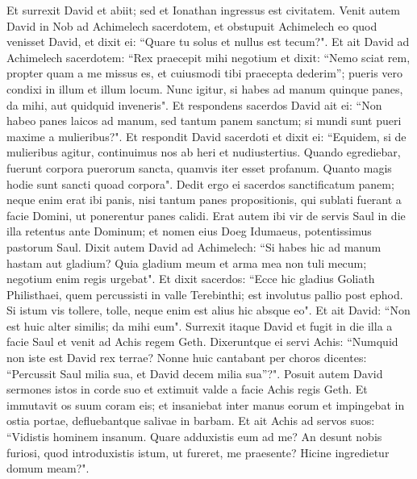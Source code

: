 \begin{biblechapter}  
\verse Et surrexit David et abiit; sed et Ionathan ingressus est civitatem.  
\verse Venit autem David in Nob ad Achimelech sacerdotem, et obstupuit Achimelech eo quod venisset David, et dixit ei: “Quare tu solus et nullus est tecum?". 
\verse Et ait David ad Achimelech sacerdotem: “Rex praecepit mihi negotium et dixit: “Nemo sciat rem, propter quam a me missus es, et cuiusmodi tibi praecepta dederim”; pueris vero condixi in illum et illum locum. 
\verse Nunc igitur, si habes ad manum quinque panes, da mihi, aut quidquid inveneris". 
\verse Et respondens sacerdos David ait ei: “Non habeo panes laicos ad manum, sed tantum panem sanctum; si mundi sunt pueri maxime a mulieribus?". 
\verse Et respondit David sacerdoti et dixit ei: “Equidem, si de mulieribus agitur, continuimus nos ab heri et nudiustertius. Quando egrediebar, fuerunt corpora puerorum sancta, quamvis iter esset profanum. Quanto magis hodie sunt sancti quoad corpora". 
\verse Dedit ergo ei sacerdos sanctificatum panem; neque enim erat ibi panis, nisi tantum panes propositionis, qui sublati fuerant a facie Domini, ut ponerentur panes calidi. 
\verse Erat autem ibi vir de servis Saul in die illa retentus ante Dominum; et nomen eius Doeg Idumaeus, potentissimus pastorum Saul. 
\verse Dixit autem David ad Achimelech: “Si habes hic ad manum hastam aut gladium? Quia gladium meum et arma mea non tuli mecum; negotium enim regis urgebat". 
\verse Et dixit sacerdos: “Ecce hic gladius Goliath Philisthaei, quem percussisti in valle Terebinthi; est involutus pallio post ephod. Si istum vis tollere, tolle, neque enim est alius hic absque eo". Et ait David: “Non est huic alter similis; da mihi eum". 
\verse Surrexit itaque David et fugit in die illa a facie Saul et venit ad Achis regem Geth. 
\verse Dixeruntque ei servi Achis: “Numquid non iste est David rex terrae? Nonne huic cantabant per choros dicentes: “Percussit Saul milia sua, et David decem milia sua”?". 
\verse Posuit autem David sermones istos in corde suo et extimuit valde a facie Achis regis Geth. 
\verse Et immutavit os suum coram eis; et insaniebat inter manus eorum et impingebat in ostia portae, defluebantque salivae in barbam.  
\verse Et ait Achis ad servos suos: “Vidistis hominem insanum. Quare adduxistis eum ad me? 
\verse An desunt nobis furiosi, quod introduxistis istum, ut fureret, me praesente? Hicine ingredietur domum meam?". 
\end{biblechapter}

